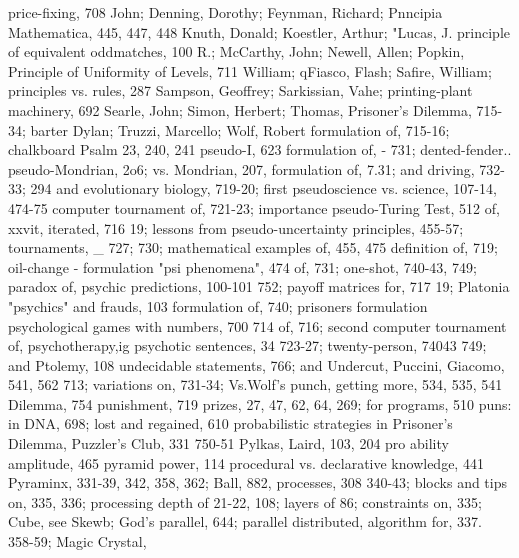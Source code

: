 price-fixing, 708                                  John; Denning, Dorothy; Feynman, Richard;
Pnncipia Mathematica, 445, 447, 448                 Knuth, Donald; Koestler, Arthur; "Lucas, J.
principle of equivalent oddmatches, 100             R.; McCarthy, John; Newell, Allen; Popkin,
Principle of Uniformity of Levels, 711              William; qFiasco, Flash; Safire, William;
principles vs. rules, 287                           Sampson, Geoffrey; Sarkissian, Vahe;
printing-plant machinery, 692                       Searle, John; Simon, Herbert; Thomas,
Prisoner's Dilemma, 715-34; barter                  Dylan; Truzzi, Marcello; Wolf, Robert
 formulation of, 715-16; chalkboard                Psalm 23, 240, 241 pseudo-I, 623
 formulation of, - 731; dented-fender..            pseudo-Mondrian, 2o6; vs. Mondrian, 207,
 formulation of, 7.31; and driving, 732-33;         294
 and evolutionary biology, 719-20; first           pseudoscience vs. science, 107-14, 474-75
 computer tournament of, 721-23; importance         pseudo-Turing Test, 512
 of, xxvit, iterated, 716 19; lessons from         pseudo-uncertainty principles, 455-57;
 tournaments, \_ 727; 730; mathematical              examples of, 455, 475
 definition of, 719; oil-change - formulation      "psi phenomena", 474
 of, 731; one-shot, 740-43, 749; paradox of,       psychic predictions, 100-101
 752; payoff matrices for, 717 19; Platonia        "psychics" and frauds, 103
 formulation of, 740; prisoners formulation        psychological games with numbers, 700 714
 of, 716; second computer tournament of,           psychotherapy,ig psychotic sentences, 34
 723-27; twenty-person, 74043 749; and             Ptolemy, 108
 undecidable statements, 766; and Undercut,        Puccini, Giacomo, 541, 562
 713; variations on, 731-34; Vs.Wolf's             punch, getting more, 534, 535, 541
 Dilemma, 754                                      punishment, 719
prizes, 27, 47, 62, 64, 269; for programs, 510     puns: in DNA, 698; lost and regained, 610
probabilistic strategies in Prisoner's Dilemma,    Puzzler's Club, 331
 750-51                                            Pylkas, Laird, 103, 204
pro ability amplitude, 465                         pyramid power, 114
procedural vs. declarative knowledge, 441          Pyraminx, 331-39, 342, 358, 362; Ball, 882,
 processes, 308                                     340-43; blocks and tips on, 335, 336;
processing depth of 21-22, 108; layers of 86;       constraints on, 335; Cube, see Skewb; God's
 parallel, 644; parallel distributed,               algorithm for, 337. 358-59; Magic Crystal,

